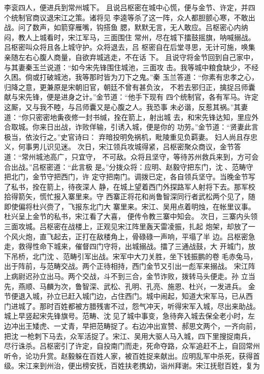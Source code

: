 李衮四人，便进兵到常州城下。
且说吕枢密在城中心慌，便与金节、许定，并四个统制官商议退宋江之策。诸将见
李逵等杀了这一阵，众人都胆颤心寒，不敢出战。问了数声，如箭穿雁嘴，钩搭鱼
腮，默默无言，无人敢应。吕枢密心内纳闷，教人上城看时，宋江军马，三面围住
常州，尽在城下擂鼓摇旗，呐喊搦战。吕枢密叫众将且各上城守护。众将退去，吕
枢密自在后堂寻思，无计可施，唤集亲随左右心腹人商量，自欲弃城逃走，不在话
下。
且说守将金节回到自己家中，与其妻秦玉兰说道：“如今宋先锋围住城池，三面攻
击。我等城中粮食缺少，不经久困。倘或打破城池，我等那时皆为刀下之鬼。”秦
玉兰答道：“你素有忠孝之心，归降之意，更兼原是宋朝旧官，朝廷不曾有甚负汝，
不若去邪归正，擒捉吕师囊献与宋先锋，便是进身之计。”金节道：“他手下现有
四个统制官，各有军马。许定这厮，又与我不睦，与吕师囊又是心腹之人。我恐事
未必谐，反惹其祸。”其妻道：“你只密密地夤夜修一封书缄，拴在箭上，射出城
去，和宋先锋达知，里应外合取城。你来日出战，诈败佯输，引诱入城，便是你的
功劳。”金节道：“贤妻此言极当，依汝行之。”史官诗曰：
弃暗投明免祸机，毗陵重见负羁妻。
妇人尚且存忠义，何事男儿识见迷。
次日，宋江领兵攻城得紧，吕枢密聚众商议，金节答道：“常州城池高广，只宜守，
不可敌。众将且坚守，等待苏州救兵来到，方可会合出战。”吕枢密道：“此言极
是。”分拨众将：应明、赵毅守把东门，沈、范畴守把北门，金节守把西门，许
定守把南门。调拨已定，各自领兵坚守。当晚金节写了私书，拴在箭上，待夜深人
静，在城上望着西门外探路军人射将下去。那军校拾得箭矢，慌忙报入寨里来。守
西寨正将花和尚鲁智深同行者武松两个见了，随即使偏将杜兴赍了，飞报东北门大
寨里来。宋江、吴用点着明烛，在帐里议事。杜兴呈上金节的私书，宋江看了大喜，
便传令教三寨中知会。
次日，三寨内头领三面攻城。吕枢密在战楼上，正观见宋江阵里轰天雷凌振，扎起
炮架，却放了一个风火炮，直飞起去，正打在敌楼角上，骨碌碌一声响，平塌了半
边。吕枢密急走，救得性命下城来，催督四门守将，出城搦战。擂了三通战鼓，大
开城门，放下吊桥，北门沈、范畴引军出战。宋军中大刀关胜，坐下钱振鹏的卷
毛赤兔马，出于阵前，与范畴交战。两个正待相持，西门金节又引出一彪军来搦战。
宋江阵上病尉迟孙立出马。两个交战，斗不到三合，金节诈败，拨转马头便走。孙
立当先，燕顺、马麟为次，鲁智深、武松、孔明、孔亮、施恩、杜兴，一发进兵。
金节便退入城，孙立已赶入城门边，占住西门。城中闹起，知道大宋军马，已从西
门进城了。那时百姓都被方腊残害不过，怨气冲天，听得宋军入城，尽出来助战。
城上早竖起宋先锋旗号。范畴、沈见了城中事变，急待奔入城去保全老小时，左
边冲出王矮虎、一丈青，早把范畴捉了。右边冲出宣赞、郝思文两个，一齐向前，
把沈一枪刺下马去，众军活捉了。宋江、吴用大驱人马入城，四下里搜捉南兵，
尽行诛杀。吕枢密引了许定，自投南门而走，死命夺路，众军追赶不上，自回常州
听令，论功升赏。赵毅躲在百姓人家，被百姓捉来献出。应明乱军中杀死，获得首
级。宋江来到州治，便出榜安抚，百姓扶老携幼，诣州拜谢。宋江抚慰百姓，复为
